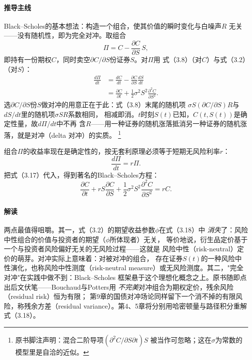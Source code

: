 \paragraph{推导主线}
Black--Scholes的基本想法：构造一个组合，使其价值的瞬时变化与白噪声$R$
无关——没有随机性，即为完全对冲。取组合
\begin{equation*}
\Pi=C-\frac{\partial C}{\partial S}\,S,
\tag{3.16}
\end{equation*}
即持有一份期权$C$，同时卖空$\partial C/\partial S$份证券$S$。对$\Pi$用
式（3.8）（对$C$）与式（3.2）（对$S$）：
\begin{align*}
\frac{d\Pi}{dt}
&=\frac{dC}{dt}-\frac{\partial C}{\partial S}\frac{dS}{dt}\\
&=\frac{\partial C}{\partial t}
+\frac{1}{2}\sigma^{2}S^{2}\frac{\partial^{2}C}{\partial S^{2}}.
\tag{3.17}
\end{align*}
选$\partial C/\partial S$份$S$做对冲的用意正在于此：式（3.8）末尾的随机项
$\sigma S(\partial C/\partial S)R$与$dS/dt$里的随机项$\sigma SR$系数相同，
相减即消。$t$时刻$S(t)$已知，$C(t,S(t))$是确定性量，故$d\Pi/dt$中不再
含$R$——用一种证券的随机涨落抵消另一种证券的随机涨落，就是对冲（delta
对冲）的实质。
\footnote{原书脚注声明：混合二阶导项$(\partial^{2}C/\partial S\partial t)S$
被当作可忽略；这在$\sigma$为常数的模型里是自洽的近似。}

组合$\Pi$的收益率现在是确定性的，按无套利原理必须等于短期无风险利率$r$：
\begin{equation*}
\frac{d\Pi}{dt}=r\Pi.
\end{equation*}
把式（3.17）代入，得到著名的Black--Scholes方程：
\begin{equation*}
\frac{\partial C}{\partial t}
+rS\frac{\partial C}{\partial S}
+\frac{1}{2}\sigma^{2}S^{2}\frac{\partial^{2}C}{\partial S^{2}}
=rC.
\tag{3.18}
\end{equation*}

\paragraph{解读}
两点最值得咀嚼。其一，式（3.2）的期望收益参数$\phi$在式（3.18）中
\emph{消失}了：风险中性组合的价值与投资者的期望（$\phi$所体现者）无关，
等价地说，衍生品定价基于一个与投资者风险偏好无关的无风险过程——这就是
风险中性（risk-neutral）定价的萌芽。对冲实际上意味着：对被对冲的组合，
存在证券$S(t)$的一种风险中性演化，也称风险中性测度（risk-neutral
measure）或无风险测度。其二，"完全对冲"在实践中做不到：Black--Scholes
框架悬于这个理想化概念之上。原书随即点出后文伏笔——Bouchaud与Potters用
\emph{不完美}对冲组合为期权定价，残余风险（residual risk）恒为有限；
第9章的国债对冲场论同样留下一个消不掉的有限风险，称残余方差（residual
variance）。第4、5章将分别用哈密顿量与路径积分重解式（3.18）。

